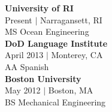 {\sc \textbf{University of RI}} \\
{\color{gray} Present $\vert$ Narragansett, RI}\\
MS Ocean Engineering \\

{\sc \textbf{DoD Language Institute}}\\ 
{\color{gray} April 2013 $\vert$ Monterey, CA } \\
AA Spanish \\

{\sc \textbf{Boston University}}\\ 
{\color{gray} May 2012 $\vert$ Boston, MA } \\
BS Mechanical Engineering \\
